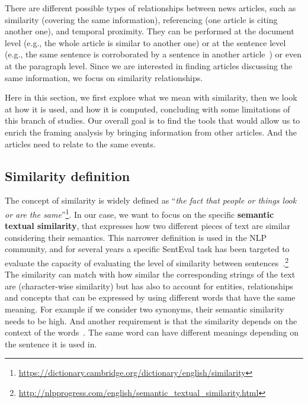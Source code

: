 There are different possible types of relationships between news articles, such as similarity (covering the same information), referencing (one article is citing another one), and temporal proximity. They can be performed at the document level (e.g., the whole article is similar to another one) or at the sentence level (e.g., the same sentence is corroborated by a sentence in another article~\cite{bountouridis2018explaining}) or even at the paragraph level.
Since we are interested in finding articles discussing the same information, we focus on similarity relationships.

Here in this section, we first explore what we mean with similarity, then we look at how it is used, and how it is computed, concluding with some limitations of this branch of studies.
Our overall goal is to find the tools that would allow us to enrich the framing analysis by bringing information from other articles. And the articles need to relate to the same events.

\subsection{Similarity definition}

The concept of similarity is widely defined as ``\emph{the fact that people or things look or are the same}''\footnote{\url{https://dictionary.cambridge.org/dictionary/english/similarity}}. In our case, we want to focus on the specific \textbf{semantic textual similarity}, that expresses how two different pieces of text are similar considering their semantics.
This narrower definition is used in the NLP community, and for several years a specific SentEval task has been targeted to evaluate the capacity of evaluating the level of similarity between sentences~\cite{conneau-kiela-2018-senteval}.\footnote{\url{http://nlpprogress.com/english/semantic\_textual\_similarity.html}}
The similarity can match with how similar the corresponding strings of the text are (character-wise similarity) but has also to account for entities, relationships and concepts that can be expressed by using different words that have the same meaning.
For example if we consider two synonyms, their semantic similarity needs to be high. 
And another requirement is that the similarity depends on the context of the words~\cite{miller1991contextual}. The same word can have different meanings depending on the sentence it is used in.

